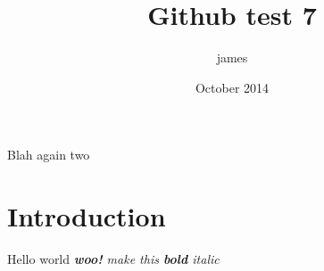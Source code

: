 \documentclass{article}
\title{Github test 7}
\author{james }
\date{October 2014}
\begin{document}
\maketitle

Blah again two

\section{Introduction}

Hello world \textit{\textbf{woo!} make this \textbf{bold} \textit{italic}}
\end{document}
